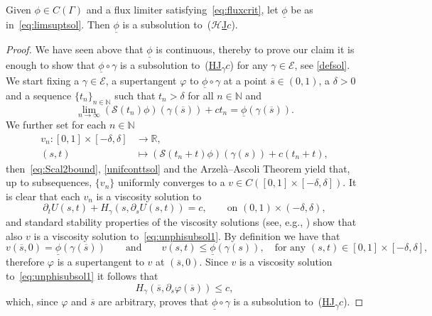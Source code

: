 \documentclass[11pt,a4paper,american]{article}
\newcommand{\Ecal}{\mathcal E}
\newcommand{\Hcal}{\mathcal H}
\newcommand{\Nds}{\mathds N}
\newcommand{\Rds}{\mathds R}
\newcommand{\Scal}{\mathcal S}
\newcommand{\ovs}{\overline s}
\newcommand{\unphi}{\underline\phi}
\newcommand{\hrefc}{\textup{(}\hyperref[eq:globeik]{\ensuremath{\Hcal}\textup{J}\ensuremath{c}}\textup{)}}
\newcommand{\ghrefc}{\textup{(}\hyperref[eq:eikg]{\textup{HJ}\textsubscript{\ensuremath{\gamma}}\ensuremath{c}}\textup{)}}
\begin{document}
    \begin{prop}\label{unphisubsol}
        Given $\phi\in C(\Gamma)$ and a flux limiter satisfying~\cref{eq:fluxcrit}, let $\unphi$ be as in~\cref{eq:limsuptsol}. Then $\unphi$ is a subsolution to~\hrefc{}.
    \end{prop}
    \begin{proof}
        We have seen above that $\unphi$ is continuous, thereby to prove our claim it is enough to show that $\unphi\circ\gamma$ is a subsolution to~\ghrefc{} for any $\gamma\in\Ecal$, see \cref{defsol}.\\
        We start fixing a $\gamma\in\Ecal$, a supertangent $\varphi$ to $\unphi\circ\gamma$ at a point $\ovs\in(0,1)$, a $\delta>0$ and a sequence $\{t_n\}_{n\in\Nds}$ such that $t_n>\delta$ for all $n\in\Nds$ and
        \begin{equation*}
            \lim_{n\to\infty}(\Scal(t_n)\phi)(\gamma(\ovs))+ct_n=\unphi(\gamma(\ovs)).
        \end{equation*}
        We further set for each $n\in\Nds$
        \begin{align*}
            v_n:[0,1]\times[-\delta,\delta]&\longrightarrow\Rds,\\
            (s,t)&\longmapsto(\Scal(t_n+t)\phi)(\gamma(s))+c(t_n+t),
        \end{align*}
        then~\cref{eq:Scal2bound}, \cref{unifconttsol} and the Arzelà--Ascoli Theorem yield that, up to subsequences, $\{v_n\}$ uniformly converges to a $v\in C([0,1]\times[-\delta,\delta])$. It is clear that each $v_n$ is a viscosity solution to
        \begin{equation}\label{eq:unphisubsol1}
            \partial_t U(s,t)+H_\gamma(s,\partial_s U(s,t))=c,\qquad\text{on }(0,1)\times(-\delta,\delta),
        \end{equation}
        and standard stability properties of the viscosity solutions (see, e.g., \cite[Proposition II.2.2]{BardiCapuzzo-Dolcetta97}) show that also $v$ is a viscosity solution to~\cref{eq:unphisubsol1}. By definition we have that
        \begin{equation*}
            v(\ovs,0)=\unphi(\gamma(\ovs))\qquad\text{and}\qquad v(s,t)\le\unphi(\gamma(s)),\quad\text{for any }(s,t)\in[0,1]\times[-\delta,\delta],
        \end{equation*}
        therefore $\varphi$ is a supertangent to $v$ at $(\ovs,0)$. Since $v$ is a viscosity solution to~\cref{eq:unphisubsol1} it follows that
        \begin{equation*}
            H_\gamma(\ovs,\partial_s\varphi(\ovs))\le c,
        \end{equation*}
        which, since $\varphi$ and $\ovs$ are arbitrary, proves that $\unphi\circ\gamma$ is a subsolution to~\ghrefc{}.
    \end{proof}
\end{document}
